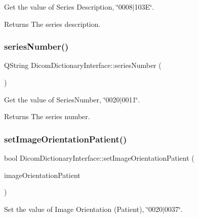 Get the value of Series Description, \char`\"{}0008$\vert$103\+E\char`\"{}. 

\begin{DoxyReturn}{Returns}
The series description. 
\end{DoxyReturn}
\mbox{\label{class_dicom_dictionary_interface_a0262904d88f9e9a8dbd30bc112ec4b43}} 
\subsubsection{\texorpdfstring{series\+Number()}{seriesNumber()}}
{\footnotesize\ttfamily Q\+String Dicom\+Dictionary\+Interface\+::series\+Number (\begin{DoxyParamCaption}{ }\end{DoxyParamCaption})}



Get the value of Series\+Number, \char`\"{}0020$\vert$0011\char`\"{}. 

\begin{DoxyReturn}{Returns}
The series number. 
\end{DoxyReturn}
\mbox{\label{class_dicom_dictionary_interface_aefac106ef1ed129d6678df977eef2bbf}} 
\subsubsection{\texorpdfstring{set\+Image\+Orientation\+Patient()}{setImageOrientationPatient()}}
{\footnotesize\ttfamily bool Dicom\+Dictionary\+Interface\+::set\+Image\+Orientation\+Patient (\begin{DoxyParamCaption}\item[{Q\+String}]{image\+Orientation\+Patient }\end{DoxyParamCaption})}



Set the value of Image Orientation (Patient), \char`\"{}0020$\vert$0037\char`\"{}. 


